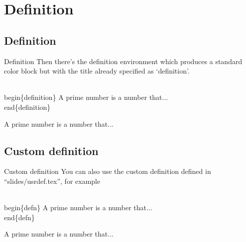 \section{Definition}
\subsection{Definition}
\label{definition}
\begin{frame}{Definition}
  Then there’s the definition environment which produces a standard color block but with the title already specified as ‘definition’.
  \begin{semiverbatim}
    \\begin\{definition\}\newline
    A prime number is a number that...\newline
    \\end\{definition\}
  \end{semiverbatim}
  \begin{definition}
    A prime number is a number that...
  \end{definition}
\end{frame}
\subsection{Custom definition}
\begin{frame}{Custom definition}
  You can also use the custom definition defined in ``slides/usrdef.tex'', for example
  \begin{semiverbatim}
    \\begin\{defn\}\newline
    A prime number is a number that...\newline
    \\end\{defn\}
  \end{semiverbatim}
  \begin{defn}
    A prime number is a number that...
  \end{defn}
\end{frame}
